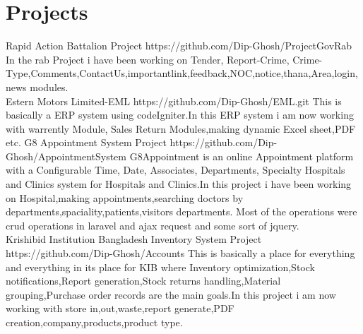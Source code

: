 \documentclass[]{cv-style}
\begin{document}
\section{Projects}
\begin{entrylist}
\entry
{}
{Rapid Action Battalion Project}
{{https://github.com/Dip-Ghosh/ProjectGovRab}}
{In the rab Project i have been working on Tender, Report-Crime, Crime-Type,Comments,ContactUs,importantlink,feedback,NOC,notice,thana,Area,login,news modules.}
\\
\entry 
{}
{Estern Motors Limited-EML }
{{https://github.com/Dip-Ghosh/EML.git}}
{This is basically a ERP system using codeIgniter.In this ERP system  i am now working with warrently Module, Sales Return Modules,making dynamic Excel sheet,PDF etc.}
\entry
{}
{G8 Appointment System Project }
{{https://github.com/Dip-Ghosh/AppointmentSystem}}
{G8Appointment is an online Appointment platform with a Configurable Time, Date, Associates, Departments, Specialty Hospitals and Clinics system for Hospitals and Clinics.In this project i have been working on  Hospital,making appointments,searching doctors by departments,spaciality,patients,visitors departments. Most of the operations were crud operations in laravel and ajax request and some sort of jquery.}
\\
\entry 
{}
{Krishibid Institution Bangladesh Inventory System Project }
{{https://github.com/Dip-Ghosh/Accounts}}
{This is basically a place for everything and everything in its place for KIB where Inventory optimization,Stock notifications,Report generation,Stock returns handling,Material grouping,Purchase order records are the main goals.In this project i am now working with store in,out,waste,report generate,PDF creation,company,products,product type.}\\

\end{entrylist}
\clearpage
\hspace{82cm}
\vspace{0.7cm}
\end{document}
